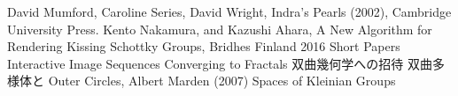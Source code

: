 {
\setlength{\baselineskip}{13pt}
\begin{thebibliography}{99}

         David Mumford, Caroline Series, David Wright, Indra's Pearls
         (2002), Cambridge University Press.
         Kento Nakamura, and Kazushi Ahara, A New Algorithm for
         Rendering Kissing Schottky Groups,
         Bridhes Finland 2016 Short Papers
        Interactive Image Sequences Converging to Fractals
        双曲幾何学への招待
        双曲多様体と
        Outer Circles, Albert Marden (2007)
        Spaces of Kleinian Groups
\end{thebibliography}
}